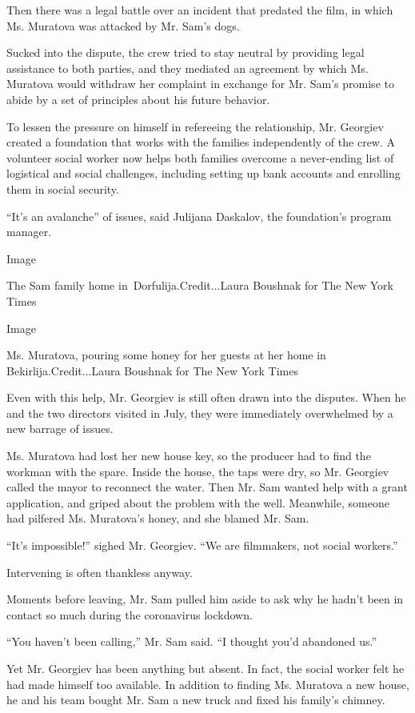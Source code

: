 Then there was a legal battle over an incident that predated the film,
in which Ms. Muratova was attacked by Mr. Sam's dogs.

Sucked into the dispute, the crew tried to stay neutral by providing
legal assistance to both parties, and they mediated an agreement by
which Ms. Muratova would withdraw her complaint in exchange for Mr.
Sam's promise to abide by a set of principles about his future behavior.

To lessen the pressure on himself in refereeing the relationship, Mr.
Georgiev created a foundation that works with the families independently
of the crew. A volunteer social worker now helps both families overcome
a never-ending list of logistical and social challenges, including
setting up bank accounts and enrolling them in social security.

``It's an avalanche'' of issues, said Julijana Daskalov, the
foundation's program manager.

Image

The Sam family home in~Dorfulija.Credit...Laura Boushnak for The New
York Times

Image

Ms. Muratova, pouring some honey for her guests at her home in
Bekirlija.Credit...Laura Boushnak for The New York Times

Even with this help, Mr. Georgiev is still often drawn into the
disputes. When he and the two directors visited in July, they were
immediately overwhelmed by a new barrage of issues.

Ms. Muratova had lost her new house key, so the producer had to find the
workman with the spare. Inside the house, the taps were dry, so Mr.
Georgiev called the mayor to reconnect the water. Then Mr. Sam wanted
help with a grant application, and griped about the problem with the
well. Meanwhile, someone had pilfered Ms. Muratova's honey, and she
blamed Mr. Sam.

``It's impossible!'' sighed Mr. Georgiev. ``We are filmmakers, not
social workers.''

Intervening is often thankless anyway.

Moments before leaving, Mr. Sam pulled him aside to ask why he hadn't
been in contact so much during the coronavirus lockdown.

``You haven't been calling,'' Mr. Sam said. ``I thought you'd abandoned
us.''

Yet Mr. Georgiev has been anything but absent. In fact, the social
worker felt he had made himself too available. In addition to finding
Ms. Muratova a new house, he and his team bought Mr. Sam a new truck and
fixed his family's chimney.

